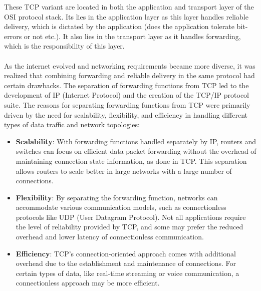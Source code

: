 These TCP variant are located in both the application and transport layer of the OSI protocol stack. Its lies in the application layer as this layer handles reliable delivery, which is dictated by the application (does the application tolerate bit-errors or not etc.). It also lies in the transport layer as it handles forwarding, which is the responsibility of this layer. \\
\\
As the internet evolved and networking requirements became more diverse, it was realized that combining forwarding and reliable delivery in the same protocol had certain drawbacks. The separation of forwarding functions from TCP led to the development of IP (Internet Protocol) and the creation of the TCP/IP protocol suite. The reasons for separating forwarding functions from TCP were primarily driven by the need for scalability, flexibility, and efficiency in handling different types of data traffic and network topologies:
\begin{itemize}
    \item \textbf{Scalability}: With forwarding functions handled separately by IP, routers and switches can focus on efficient data packet forwarding without the overhead of maintaining connection state information, as done in TCP. This separation allows routers to scale better in large networks with a large number of connections.
    \item \textbf{Flexibility}: By separating the forwarding function, networks can accommodate various communication models, such as connectionless protocols like UDP (User Datagram Protocol). Not all applications require the level of reliability provided by TCP, and some may prefer the reduced overhead and lower latency of connectionless communication.
    \item \textbf{Efficiency}: TCP's connection-oriented approach comes with additional overhead due to the establishment and maintenance of connections. For certain types of data, like real-time streaming or voice communication, a connectionless approach may be more efficient.
\end{itemize}






